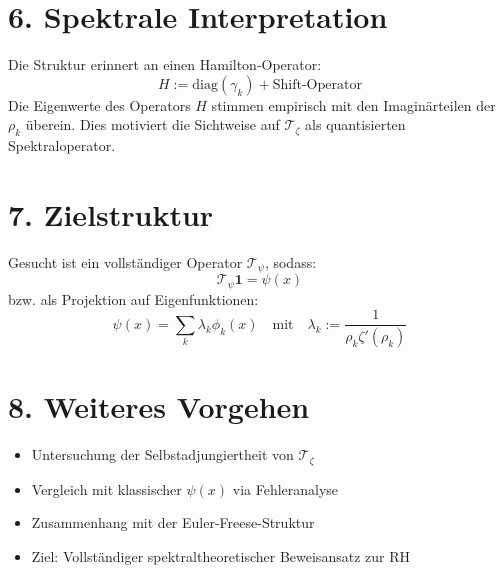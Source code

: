 \documentclass[12pt]{article}
\begin{document}
\section*{6. Spektrale Interpretation}
Die Struktur erinnert an einen Hamilton-Operator:
\[
H := \text{diag}(\gamma_k) + \text{Shift-Operator}
\]
Die Eigenwerte des Operators $H$ stimmen empirisch mit den Imaginärteilen der $\rho_k$ überein. Dies motiviert die Sichtweise auf $\mathcal{T}_\zeta$ als quantisierten Spektraloperator.

\section*{7. Zielstruktur}
Gesucht ist ein vollständiger Operator $\mathcal{T}_\psi$, sodass:
\[
\mathcal{T}_\psi \mathbf{1} = \psi(x)
\]
bzw. als Projektion auf Eigenfunktionen:
\[
\psi(x) = \sum_{k} \lambda_k \phi_k(x)
\quad \text{mit} \quad \lambda_k := \frac{1}{\rho_k \zeta'(\rho_k)}
\]

\section*{8. Weiteres Vorgehen}
\begin{itemize}
  \item Untersuchung der Selbstadjungiertheit von $\mathcal{T}_\zeta$
  \item Vergleich mit klassischer $\psi(x)$ via Fehleranalyse
  \item Zusammenhang mit der Euler-Freese-Struktur
  \item Ziel: Vollständiger spektraltheoretischer Beweisansatz zur RH
\end{itemize}
\end{document}
